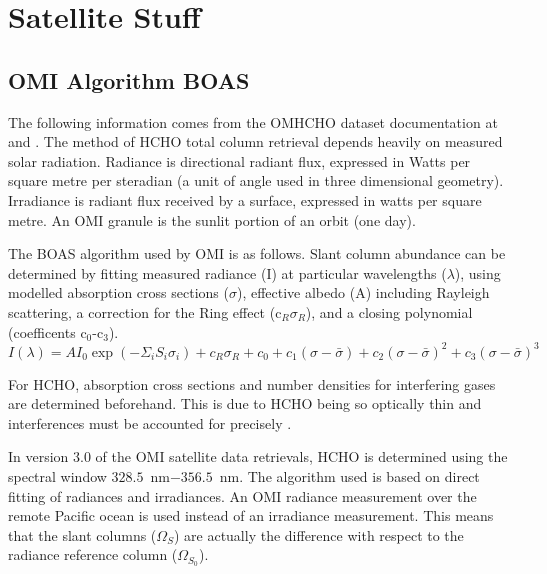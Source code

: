 \section{Satellite Stuff}
  \label{SuppNotes:Satellite}
  \subsection{OMI Algorithm BOAS}
    \label{SuppNotes:Satellite:OMI_BOAS}
    The following information comes from the OMHCHO dataset documentation at \textcite{Kurosu2014} and \textcite{Chance2002}.
    The method of HCHO total column retrieval depends heavily on measured solar radiation.
    Radiance is directional radiant flux, expressed in Watts per square metre per steradian (a unit of angle used in three dimensional geometry).
    Irradiance is radiant flux received by a surface, expressed in watts per square metre.
    An OMI granule is the sunlit portion of an orbit (one day).
    
    The BOAS algorithm used by OMI is as follows.
    Slant column abundance can be determined by fitting measured radiance (I) at particular wavelengths ($\lambda$), using modelled absorption cross sections ($\sigma$), effective albedo (A) including Rayleigh scattering, a correction for the Ring effect (c$_R\sigma_R$), and a closing polynomial (coefficents c$_0$-c$_3$).
    \begin{equation}
    \label{ch_HCHO:eqn:BOAS_HCHO}
    I(\lambda)  = A I_0 \exp {\left( - \Sigma_i S_i \sigma_i \right) } + c_R\sigma_R + c_0 + c_1(\sigma-\bar{\sigma}) + c_2(\sigma - \bar{\sigma})^2 + c_3(\sigma - \bar{\sigma})^3 
    \end{equation}
    
    For HCHO, absorption cross sections and number densities for interfering gases are determined beforehand.
    This is due to HCHO being so optically thin and interferences must be accounted for precisely \parencite{Chance2002}.
    
    In version 3.0 of the OMI satellite data retrievals, HCHO is determined using the spectral window $328.5$~nm$ - 356.5$~nm. 
    The algorithm used is based on direct fitting of radiances and irradiances.
    An OMI radiance measurement over the remote Pacific ocean is used instead of an irradiance measurement.
    This means that the slant columns ($\Omega_S$) are actually the difference with respect to the radiance reference column ($\Omega_{S_0}$).
    
